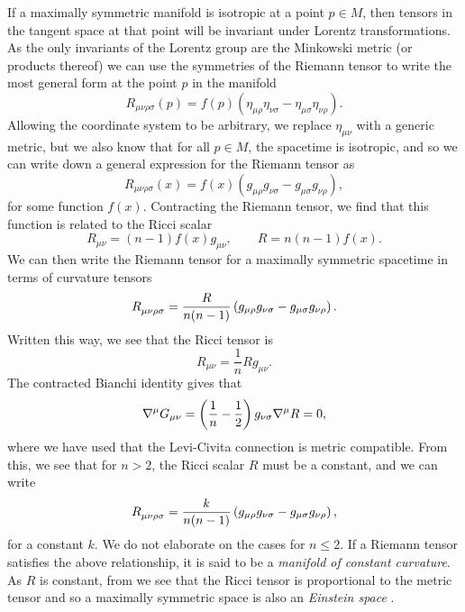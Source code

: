 If a maximally symmetric manifold is isotropic at a point $p \in M$, then tensors in the tangent space at that point will be invariant under Lorentz transformations. As the only invariants of the Lorentz group are the Minkowski metric (or products thereof) we can use the symmetries of the Riemann tensor to write the most general form at the point $p$ in the manifold
\begin{equation*}
	R_{\mu \nu \rho \sigma} (p) = f(p) \left( \eta_{\mu \rho} \eta_{\nu \sigma} - \eta_{\mu \sigma} \eta_{\nu \rho} \right). 
\end{equation*}
Allowing the coordinate system to be arbitrary, we replace $\eta_{\mu \nu}$ with a generic metric, but we also know that for all $p \in M$, the spacetime is isotropic, and so we can write down a general expression for the Riemann tensor as
\begin{equation*}
	R_{\mu \nu \rho \sigma} (x) = f(x) \left( g_{\mu \rho} g_{\nu \sigma} - g_{\mu \sigma} g_{\nu \rho} \right) ,
\end{equation*}
for some function $f(x)$. Contracting the Riemann tensor, we find that this function is related to the Ricci scalar
\begin{equation*}
	R_{\mu \nu} = (n - 1) f(x) g_{\mu \nu}, \qquad R = n (n - 1) f(x).
\end{equation*}
We can then write the Riemann tensor for a maximally symmetric spacetime in terms of curvature tensors
\begin{equation*}
	\tensor{R}{_{\mu \nu \rho \sigma}} = \frac{R}{n(n-1)} \left( g_{\mu \rho} g_{\nu \sigma} - g_{\mu \sigma} g_{\nu \rho} \right).
\end{equation*}
Written this way, we see that the Ricci tensor is
\begin{equation}
\label{eq:espace}
	R_{\mu \nu} = \frac1n R g_{\mu \nu}.
\end{equation}
The contracted Bianchi identity gives that
\begin{equation*}
	\nabla^\mu G_{\mu \nu} = \left(\frac1n - \frac{1}{2} \right) g_{\nu \sigma} \nabla^\mu R = 0,
\end{equation*} 
where we have used that the Levi-Civita connection is metric compatible. From this, we see that for $n > 2$, the Ricci scalar $R$ must be a constant, and we can write 
\begin{equation*}
	\tensor{R}{_{\mu \nu \rho \sigma}} = \frac{k}{n(n-1)} \left( g_{\mu \rho} g_{\nu \sigma} - g_{\mu \sigma} g_{\nu \rho} \right),
\end{equation*}
for a constant $k$. We do not elaborate on the cases for $n \leq 2$. If a Riemann tensor satisfies the above relationship, it is said to be a \emph{manifold of constant curvature}. As $R$ is constant, from  we see that the Ricci tensor is proportional to the metric tensor and so a maximally symmetric space is also an \emph{Einstein space} \cite{besse1987einstein}.

